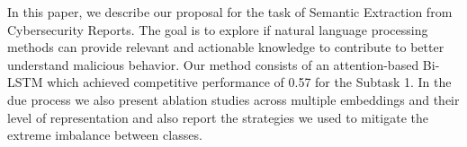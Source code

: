 In this paper, we describe our proposal for the task of Semantic Extraction from Cybersecurity Reports. The goal is to explore if natural language processing methods can provide relevant and actionable knowledge to contribute to better understand malicious behavior. Our method consists of an attention-based Bi-LSTM which achieved competitive performance of 0.57 for the Subtask 1. In the due process we also present ablation studies across multiple embeddings and their level of representation and also report the strategies we used to mitigate the extreme imbalance between classes.
